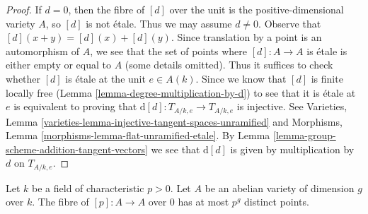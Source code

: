 \begin{proof}
If $d = 0$, then the fibre of $[d]$ over the unit is the
positive-dimensional variety $A$, so $[d]$ is not \'etale.
Thus we may assume $d \not= 0$.
Observe that $[d](x + y) = [d](x) + [d](y)$. Since translation by a
point is an automorphism of $A$, we see that the set of points where
$[d] : A \to A$ is \'etale is either empty or equal to $A$ (some details
omitted). Thus it suffices to check whether $[d]$ is \'etale at
the unit $e \in A(k)$. Since we know that $[d]$ is finite locally free
(Lemma \ref{lemma-degree-multiplication-by-d})
to see that it is \'etale at $e$ is equivalent to
proving that $\text{d}[d] : T_{A/k, e} \to T_{A/k, e}$ is injective. See
Varieties, Lemma \ref{varieties-lemma-injective-tangent-spaces-unramified} and
Morphisms, Lemma \ref{morphisms-lemma-flat-unramified-etale}.
By Lemma \ref{lemma-group-scheme-addition-tangent-vectors} we see that
$\text{d}[d]$ is given by multiplication by $d$ on $T_{A/k, e}$.
\end{proof}

\begin{lemma}
\label{lemma-abelian-variety-multiplication-by-p}
Let $k$ be a field of characteristic $p > 0$. Let $A$ be an abelian variety
of dimension $g$
over $k$. The fibre of $[p] : A \to A$ over $0$ has at most
$p^g$ distinct points.
\end{lemma}

